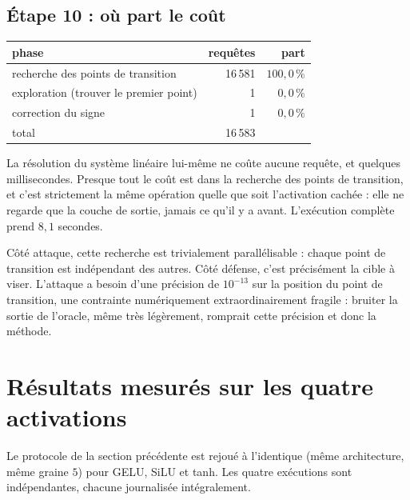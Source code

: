 \documentclass[11pt]{article}
\begin{document}
\subsection*{Étape 10 : où part le coût}

\begin{center}
\begin{tabular}{lrr}
\toprule
phase & requêtes & part \\
\midrule
recherche des points de transition & 16\,581 & $100{,}0\,\%$ \\
exploration (trouver le premier point) & 1 & $0{,}0\,\%$ \\
correction du signe & 1 & $0{,}0\,\%$ \\
\midrule
total & 16\,583 & \\
\bottomrule
\end{tabular}
\end{center}

La résolution du système linéaire lui-même ne coûte aucune requête, et
quelques millisecondes. Presque tout le coût est dans la recherche des
points de transition, et c'est strictement la même opération quelle que
soit l'activation cachée : elle ne regarde que la couche de sortie, jamais
ce qu'il y a avant. L'exécution complète prend $8{,}1$ secondes.

\begin{remarque}
Côté attaque, cette recherche est trivialement parallélisable : chaque point
de transition est indépendant des autres. Côté défense, c'est précisément
la cible à viser. L'attaque a besoin d'une précision de $10^{-13}$ sur la
position du point de transition, une contrainte numériquement
extraordinairement fragile : bruiter la sortie de l'oracle, même très
légèrement, romprait cette précision et donc la méthode.
\end{remarque}

\section{Résultats mesurés sur les quatre activations}
\label{sec:resultats}

Le protocole de la section précédente est rejoué à l'identique (même
architecture, même graine $5$) pour GELU, SiLU et tanh. Les quatre
exécutions sont indépendantes, chacune journalisée intégralement.
\end{document}

